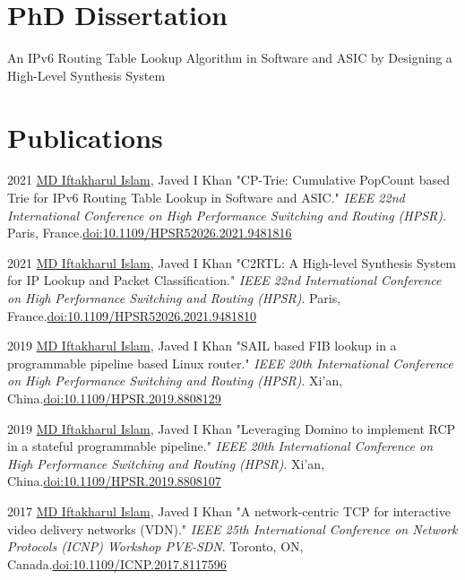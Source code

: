\documentclass[11pt,letterpaper]{report}
\begin{document}
    \section*{PhD Dissertation}

	An IPv6 Routing Table Lookup Algorithm in Software and ASIC by Designing a High-Level Synthesis System



    \section*{Publications}



    \begin{tablist}
        \item[2021] \tab{}\underline{MD Iftakharul Islam}, Javed I Khan "CP-Trie: Cumulative PopCount based Trie for IPv6 Routing Table Lookup in Software and ASIC." \textit{IEEE 22nd International Conference on High Performance Switching and Routing (HPSR)}. Paris, France.\@ \href{https://ieeexplore.ieee.org/document/9481816}{doi:10.1109/HPSR52026.2021.9481816}

        \item[2021] \tab{}\underline{MD Iftakharul Islam}, Javed I Khan "C2RTL: A High-level Synthesis System for IP Lookup and Packet Classification." \textit{IEEE 22nd International Conference on High Performance Switching and Routing (HPSR)}. Paris, France.\@ \href{https://ieeexplore.ieee.org/document/9481810}{doi:10.1109/HPSR52026.2021.9481810}

        \item[2019] \tab{}\underline{MD Iftakharul Islam}, Javed I Khan "SAIL based FIB lookup in a programmable pipeline based Linux router." \textit{IEEE 20th International Conference on High Performance Switching and Routing (HPSR)}. Xi'an, China.\@ \href{https://ieeexplore.ieee.org/document/8808129}{doi:10.1109/HPSR.2019.8808129}

        \item[2019] \tab{}\underline{MD Iftakharul Islam}, Javed I Khan "Leveraging Domino to implement RCP in a stateful programmable pipeline." \textit{IEEE 20th International Conference on High Performance Switching and Routing (HPSR)}. Xi'an, China.\@ \href{https://ieeexplore.ieee.org/document/8808107}{doi:10.1109/HPSR.2019.8808107}
        
        \item[2017] \tab{}\underline{MD Iftakharul Islam}, Javed I Khan "A network-centric TCP for interactive video delivery networks (VDN)." \textit{IEEE 25th International Conference on Network Protocols (ICNP) Workshop PVE-SDN}. Toronto, ON, Canada.\@ \href{https://ieeexplore.ieee.org/document/8117596}{doi:10.1109/ICNP.2017.8117596}


\end{tablist}
\end{document}

